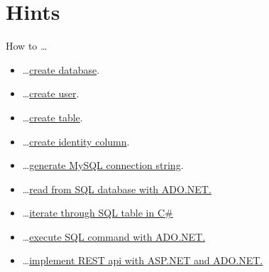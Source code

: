 \documentclass[12pt]{article}
\begin{document}
\clearpage

\section*{Hints}
How to \dots
\begin{itemize}
\item \dots \href{https://dev.mysql.com/doc/refman/5.7/en/creating-database.html}{create database}.
\item \dots \href{https://www.digitalocean.com/community/tutorials/mysql-ru}{create user}.
\item \dots \href{https://dev.mysql.com/doc/refman/5.5/en/creating-tables.html}{create table}.
\item \dots \href{https://dev.mysql.com/doc/refman/5.7/en/example-auto-increment.html}{create identity column}.
\item \dots \href{https://www.connectionstrings.com/mysql/}{generate MySQL connection string}.
\item \dots \href{https://stackoverflow.com/questions/6073382/read-sql-table-into-c-sharp-datatable}{read from SQL database with ADO.NET.}
\item \dots \href{https://stackoverflow.com/questions/1774498/how-to-iterate-through-a-datatable}{iterate through SQL table in C\#}
\item \dots \href{https://docs.microsoft.com/en-us/dotnet/framework/data/adonet/executing-a-command}{execute SQL command with ADO.NET.}
\item \dots \href{http://www.c-sharpcorner.com/UploadFile/97fc7a/webapi-restful-operations-in-webapi-using-ado-net-objects-a/}{implement REST api with ASP.NET and ADO.NET.}

\end{itemize}
\end{document}
